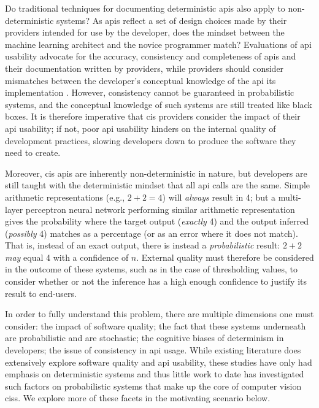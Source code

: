 Do traditional techniques for documenting deterministic \glspl{api} also apply to non-deterministic systems? As \glspl{api} reflect a set of design choices made by their providers intended for use by the developer, does the mindset between the machine learning architect and the novice programmer match? Evaluations of \gls{api} usability advocate for the accuracy, consistency and completeness of \glspl{api} and their documentation \citep{Piccioni:2013em,Robillard:2009uk} written by providers, while providers should consider mismatches between the developer's conceptual knowledge of the \gls{api} its implementation \citep{Ko:2011fb}. However, consistency cannot be guaranteed in probabilistic systems, and the conceptual knowledge of such systems are still treated like black boxes. It is therefore imperative that \gls{cis} providers consider the impact of their \gls{api} usability; if not, poor \gls{api} usability hinders on the internal quality of development practices, slowing developers down to produce the software they need to create.

Moreover, \gls{cis} \glspl{api} are inherently non-deterministic in nature, but developers are still taught with the deterministic mindset that all \gls{api} calls are the same. Simple arithmetic representations (e.g., $2+2=4$) will \textit{always} result in 4; but a multi-layer perceptron neural network performing similar arithmetic representation \citep{Blake:1998vd} gives the probability where the target output (\textit{exactly} 4) and the output inferred (\textit{possibly} 4) matches as a percentage (or as an error where it does not match). That is, instead of an exact output, there is instead a \textit{probabilistic} result: $2+2$ \textit{may} equal 4 with a confidence of $n$. External quality must therefore be considered in the outcome of these systems, such as in the case of thresholding values, to consider whether or not the inference has a high enough confidence to justify its result to end-users.

In order to fully understand this problem, there are multiple dimensions one must consider: the impact of software quality; the fact that these systems underneath are probabilistic and are stochastic; the cognitive biases of determinism in developers; the issue of consistency in \gls{api} usage. While existing literature does extensively explore software quality and \gls{api} usability, these studies have only had emphasis on deterministic systems and thus little work to date has investigated such factors on probabilistic systems that make up the core of computer vision \glspl{cis}. We explore more of these facets in the motivating scenario below.

